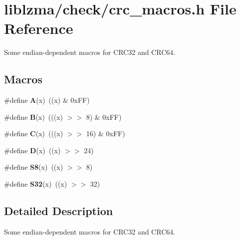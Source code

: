 \section{liblzma/check/crc\-\_\-macros.h File Reference}
\label{crc__macros_8h}


Some endian-\/dependent macros for C\-R\-C32 and C\-R\-C64.  


\subsection*{Macros}
\begin{DoxyCompactItemize}
\item 
\#define {\bfseries A}(x)~((x) \& 0x\-F\-F)\label{crc__macros_8h_a3d7d1b6b25e26030cf09f680a1aa0e81}

\item 
\#define {\bfseries B}(x)~(((x) $>$$>$ 8) \& 0x\-F\-F)\label{crc__macros_8h_a7b96e3a863c6ef1b261c051574113e7c}

\item 
\#define {\bfseries C}(x)~(((x) $>$$>$ 16) \& 0x\-F\-F)\label{crc__macros_8h_ac54ae397901fe700628cafadea3c5208}

\item 
\#define {\bfseries D}(x)~((x) $>$$>$ 24)\label{crc__macros_8h_afde8558db9d410d0f8b1930a5a369bdf}

\item 
\#define {\bfseries S8}(x)~((x) $>$$>$ 8)\label{crc__macros_8h_a4d7041a2f2d398dc49293e0638261315}

\item 
\#define {\bfseries S32}(x)~((x) $>$$>$ 32)\label{crc__macros_8h_a216733d65bf68cb0eb4bcfc3188aee18}

\end{DoxyCompactItemize}


\subsection{Detailed Description}
Some endian-\/dependent macros for C\-R\-C32 and C\-R\-C64. 